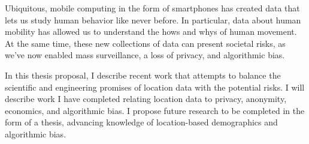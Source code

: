 Ubiquitous, mobile computing in the form of smartphones has created data that lets us study human behavior like never before.
In particular, data about human mobility has allowed us to understand the hows and whys of human movement.
At the same time, these new collections of data can present societal risks, as we've now enabled mass surveillance, a loss of privacy, and algorithmic bias.

In this thesis proposal, I describe recent work that attempts to balance the scientific and engineering promises of location data with the potential risks.
I will describe work I have completed relating location data to privacy, anonymity, economics, and algorithmic bias.
I propose future research to be completed in the form of a thesis, advancing knowledge of location-based demographics and algorithmic bias.

